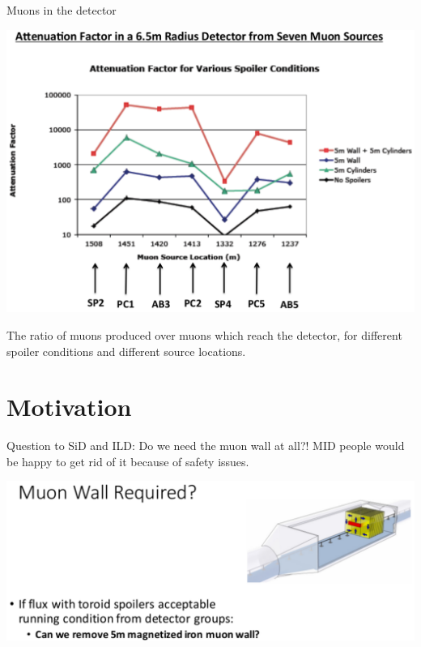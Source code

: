 \documentclass[xcolor={dvipsnames}]{beamer}
\begin{document}
\begin{frame}{Muons in the detector}
\begin{center}
\includegraphics[height=0.7\textheight]{Attenuation_Factors.pdf}
\end{center}
The ratio of muons produced over muons which reach the detector, for different spoiler conditions and different source locations.
\end{frame}

\section{Motivation}
\begin{frame}{}
Question to SiD and ILD: Do we need the muon wall at all?!
MID people would be happy to get rid of it because of safety issues.
\begin{center}
\includegraphics[height=0.5\textheight]{Muon_wall_required.pdf}
\end{center}
\end{frame}
\end{document}

